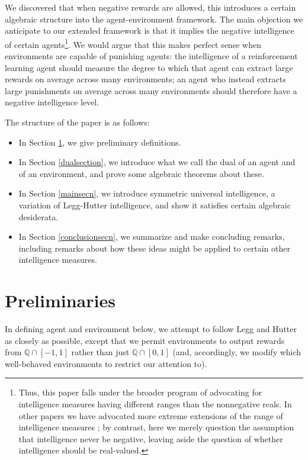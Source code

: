 \documentclass{article}
\begin{document}
We discovered that when negative rewards are allowed, this
introduces a certain algebraic structure into the agent-environment framework. The
main objection we anticipate to our extended framework
is that it implies the negative intelligence of certain
agents\footnote{Thus, this paper falls under the broader
program of advocating for intelligence measures having different ranges than
the nonnegative reals. In other papers we have advocated
more extreme extensions of the range of intelligence measures
\cite{alexander2020archimedean}; by contrast, here we merely question the
assumption that intelligence never be negative, leaving aside the
question of whether intelligence should be real-valued.}.
We would argue that this makes perfect sense when environments are capable of punishing
agents: the intelligence of a reinforcement learning agent should measure the
degree to which that agent can extract large rewards on average across many environments;
an agent who instead extracts large punishments on average across many environments
should therefore have a negative intelligence level.

The structure of the paper is as follows:
\begin{itemize}
    \item In Section \ref{prelimsecn}, we give preliminary definitions.
    \item In Section \ref{dualsection}, we introduce what we call the dual of an agent and of
        an environment, and prove some algebraic theorems about these.
    \item In Section \ref{mainsecn}, we introduce symmetric universal intelligence, a variation
        of Legg-Hutter intelligence, and show it satisfies certain algebraic desiderata.
    \item In Section \ref{conclusionsecn}, we summarize and make concluding remarks, including
        remarks about how these ideas might be applied to certain other intelligence measures.
\end{itemize}

\section{Preliminaries}
\label{prelimsecn}

In defining agent and environment below, we attempt to follow
Legg and Hutter \cite{legg2007universal} as closely as possible,
except that we permit environments to output rewards from $\mathbb Q \cap [-1,1]$
rather than just $\mathbb Q\cap [0,1]$ (and, accordingly, we modify which well-behaved
environments to restrict our attention to).
\end{document}
